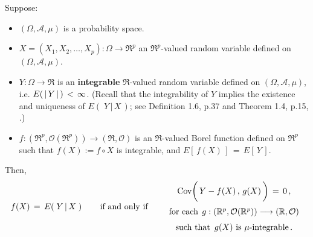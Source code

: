 \begin{theorem}
\label{definingEYXByOrthogonality}
\mbox{}
\vskip 0.2cm
\noindent
Suppose:
\begin{itemize}
\item
	$(\Omega,\mathcal{A},\mu)$ is a probability space.
\item
	$X = (X_{1}, X_{2}, \ldots, X_{p}) : \Omega \longrightarrow \Re^{p}$ an $\Re^{p}$-valued random variable
	defined on $(\Omega,\mathcal{A},\mu)$.
\item
	$Y : \Omega \longrightarrow \Re$ is an \textbf{\color{red}integrable} $\Re$-valued random variable
	defined on $(\Omega,\mathcal{A},\mu)$,
	i.e. $E(\,\vert\,\overset{{\color{white}.}}{Y}\,\vert\,)\,<\,\infty$.
	\vskip 0.01cm
	(Recall that the integrability of $Y$ implies the existence and uniqueness of $E\!\left(\;Y\,\vert\,X\,\right)$;
	see Definition 1.6, p.37 and Theorem 1.4, p.15, \cite{Shao2003}.)
\item
	$f : (\Re^{p},\mathcal{O}(\Re^{p})) \longrightarrow (\Re,\mathcal{O})$ is an $\Re$-valued Borel function
	defined on $\Re^{p}$ such that $f(X) := f\circ X$ is integrable, and $E\!\left[\,f(X)\,\right] \,=\, E\!\left[\,Y\,\right]$.
\end{itemize}
Then,
\begin{equation*}
	f(X) \,=\, E\!\left(\;Y\,\vert\,X\;\right)
	\quad\quad\textnormal{if and only if}\quad\quad
	\begin{array}{c}
	\Cov\!\left(\,Y-f(X)\,,\,\overset{{\color{white}\vert}}{g}(X)\,\right) \,=\, 0\,,
	\\
	\overset{{\color{white}-}}{\textnormal{for each}\;\, g : (\Re^{p},\mathcal{O}(\Re^{p}))\longrightarrow (\Re,\mathcal{O})}
	\\
	\overset{{\color{white}-}}{\textnormal{such that \,$g(X)$ is $\mu$-integrable}}\,.
	\end{array}
\end{equation*}
\end{theorem}

